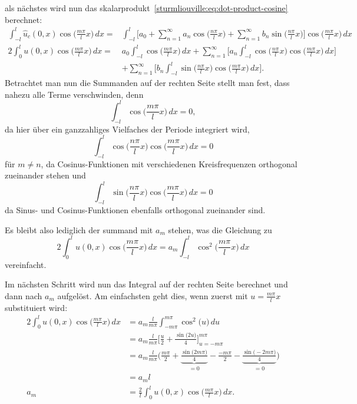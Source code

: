 als nächstes wird nun das
skalarprodukt~\eqref{sturmliouville:eq:dot-product-cosine} berechnet:
\[
\begin{aligned}
    \int_{-l}^{l}\hat{u}_c(0, x)\cos\biggl(\frac{m \pi}{l}x\biggr)\,dx
    =&
    \int_{-l}^{l} \biggl[a_0
    +
    \sum_{n = 1}^{\infty} a_n\cos\biggl(\frac{n\pi}{l}x\biggr)
    +
    \sum_{n = 1}^{\infty} b_n\sin\biggl(\frac{n\pi}{l}x\biggr)\biggr]
    \cos\biggl(\frac{m \pi}{l}x\biggr) \,dx
    \\
    2\int_{0}^{l}u(0, x)\cos\biggl(\frac{m \pi}{l}x\biggr)\,dx
    =&
    a_0 \int_{-l}^{l}\cos\biggl(\frac{m \pi}{l}x\biggr) \,dx
    +
    \sum_{n = 1}^{\infty}\biggl[a_n\int_{-l}^{l}\cos\biggl(\frac{n\pi}{l}x\biggr)
        \cos\biggl(\frac{m \pi}{l}x\biggr)\,dx\biggr]
    \\
    &+
    \sum_{n = 1}^{\infty}\biggl[b_n\int_{-l}^{l}\sin\biggl(\frac{n\pi}{l}x\biggr)
        \cos\biggl(\frac{m \pi}{l}x\biggr)\,dx\biggr].
\end{aligned}
\]
Betrachtet man nun die Summanden auf der rechten Seite stellt man fest, dass
nahezu alle Terme verschwinden, denn
\[
    \int_{-l}^{l}\cos\biggl(\frac{m \pi}{l}x\biggr) \,dx
    =
    0,
\]
da hier über ein ganzzahliges Vielfaches der Periode integriert wird,
\[
    \int_{-l}^{l}\cos\biggl(\frac{n\pi}{l}x\biggr)
    \cos\biggl(\frac{m \pi}{l}x\biggr)\,dx
    =
    0
\]
für $m\neq n$, da Cosinus-Funktionen mit verschiedenen Kreisfrequenzen
orthogonal zueinander stehen und
\[
    \int_{-l}^{l}\sin\biggl(\frac{n\pi}{l}x\biggr)
        \cos\biggl(\frac{m \pi}{l}x\biggr)\,dx
    =
    0
\]
da Sinus- und Cosinus-Funktionen ebenfalls orthogonal zueinander sind.

Es bleibt also lediglich der summand mit $a_m$ stehen, was die Gleichung zu
\[
    2\int_{0}^{l}u(0, x)\cos\biggl(\frac{m \pi}{l}x\biggr)\,dx
    =
    a_m\int_{-l}^{l}\cos^2\biggl(\frac{m\pi}{l}x\biggr)\,dx
\]
vereinfacht.

Im nächsten Schritt wird nun das Integral auf der rechten Seite
berechnet und dann nach $a_m$ aufgelöst.
Am einfachsten geht dies, wenn zuerst mit $u = \frac{m \pi}{l}x$ substituiert
wird:
\[
    \begin{aligned}
    2\int_{0}^{l}u(0, x)\cos\biggl(\frac{m \pi}{l}x\biggr)\,dx
    &=
    a_m\frac{l}{m\pi}\int_{-m\pi}^{m\pi}\cos^2\biggl(u\biggr)\,du
    \\
    &=
    a_m\frac{l}{m\pi}\biggl[\frac{u}{2} + 
    \frac{\sin\biggl(2u\biggr)}{4}\biggl]_{u=-m\pi}^{m\pi}
    \\
    &=
    a_m\frac{l}{m\pi}\biggl(\frac{m\pi}{2} + 
    \underbrace{\frac{\sin\biggl(2m\pi\biggr)}{4}}_{\displaystyle = 0} - 
    \frac{-m\pi}{2} -
    \underbrace{\frac{\sin\biggl(-2m\pi\biggr)}{4}}_{\displaystyle = 0}\biggr)
    \\
    &=
    a_m l
    \\
    a_m
    &=
    \frac{2}{l} \int_{0}^{l}u(0, x)\cos\biggl(\frac{m \pi}{l}x\biggr)\,dx.
    \end{aligned}
\]

